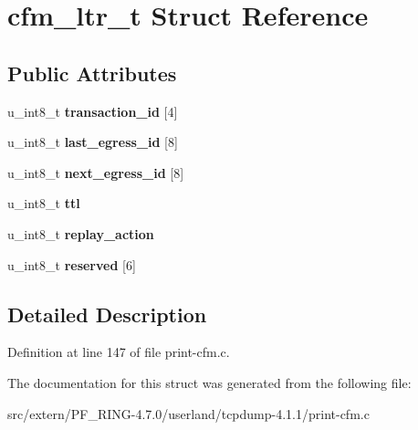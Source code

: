 \hypertarget{structcfm__ltr__t}{
\section{cfm\_\-ltr\_\-t Struct Reference}
\label{structcfm__ltr__t}
}
\subsection*{Public Attributes}
\begin{DoxyCompactItemize}
\item 
\hypertarget{structcfm__ltr__t_aaafdfe14d5820833bf504d8146a74257}{
u\_\-int8\_\-t {\bfseries transaction\_\-id} \mbox{[}4\mbox{]}}
\label{structcfm__ltr__t_aaafdfe14d5820833bf504d8146a74257}

\item 
\hypertarget{structcfm__ltr__t_a07d54e79c7471dcbc78e8844e0c17da4}{
u\_\-int8\_\-t {\bfseries last\_\-egress\_\-id} \mbox{[}8\mbox{]}}
\label{structcfm__ltr__t_a07d54e79c7471dcbc78e8844e0c17da4}

\item 
\hypertarget{structcfm__ltr__t_ac52cc50119849a3ddb34f0dc87ecfe7f}{
u\_\-int8\_\-t {\bfseries next\_\-egress\_\-id} \mbox{[}8\mbox{]}}
\label{structcfm__ltr__t_ac52cc50119849a3ddb34f0dc87ecfe7f}

\item 
\hypertarget{structcfm__ltr__t_a81cff5c07e4156b991abc62f31af62c4}{
u\_\-int8\_\-t {\bfseries ttl}}
\label{structcfm__ltr__t_a81cff5c07e4156b991abc62f31af62c4}

\item 
\hypertarget{structcfm__ltr__t_ad10d40e62f5d7f59518c275d8cd25963}{
u\_\-int8\_\-t {\bfseries replay\_\-action}}
\label{structcfm__ltr__t_ad10d40e62f5d7f59518c275d8cd25963}

\item 
\hypertarget{structcfm__ltr__t_afa24d21d7db2a2018664db95a17716be}{
u\_\-int8\_\-t {\bfseries reserved} \mbox{[}6\mbox{]}}
\label{structcfm__ltr__t_afa24d21d7db2a2018664db95a17716be}

\end{DoxyCompactItemize}


\subsection{Detailed Description}


Definition at line 147 of file print-\/cfm.c.



The documentation for this struct was generated from the following file:\begin{DoxyCompactItemize}
\item 
src/extern/PF\_\-RING-\/4.7.0/userland/tcpdump-\/4.1.1/print-\/cfm.c\end{DoxyCompactItemize}
